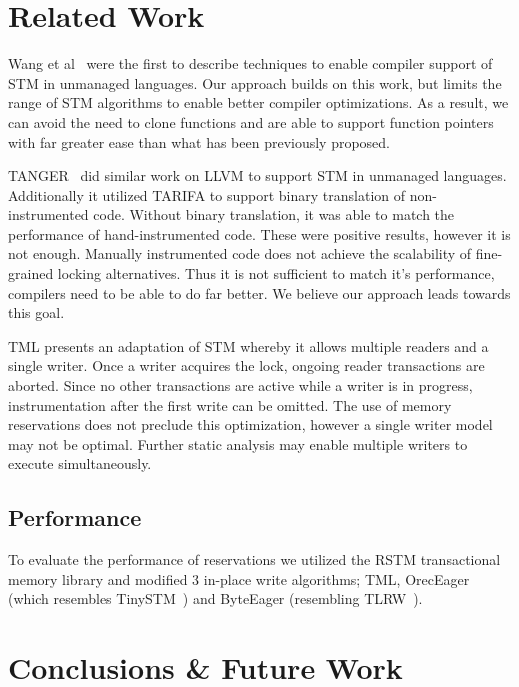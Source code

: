 \documentclass[preprint]{sigplanconf}
\begin{document}
\section{Related Work}

Wang et al~\cite{4145103} were the first to describe techniques to enable compiler support of STM in unmanaged languages. Our approach builds on this work, but limits the range of STM algorithms to enable better compiler optimizations. As a result, we can avoid the need to clone functions and are able to support function pointers with far greater ease than what has been previously proposed.

TANGER~\cite{felber2007tanger} did similar work on LLVM to support STM in unmanaged languages. Additionally it utilized TARIFA to support binary translation of non-instrumented code. Without binary translation, it was able to match the performance of hand-instrumented code. These were positive results, however it is not enough. Manually instrumented code does not achieve the scalability of fine-grained locking alternatives. Thus it is not sufficient to match it's performance, compilers need to be able to do far better. We believe our approach leads towards this goal.

TML\cite{Dalessandro:2010:TML:1885276.1885279} presents an adaptation of STM whereby it allows multiple readers and a single writer. Once a writer acquires the lock, ongoing reader transactions are aborted. Since no other transactions are active while a writer is in progress, instrumentation after the first write can be omitted. The use of memory reservations does not preclude this optimization, however a single writer model may not be optimal. Further static analysis may enable multiple writers to execute simultaneously.

\subsection{Performance}

To evaluate the performance of reservations we utilized the RSTM transactional memory library and modified 3 in-place write algorithms; TML, OrecEager (which resembles TinySTM~\cite{Felber:2008:DPT:1345206.1345241}) and ByteEager (resembling TLRW~\cite{Dice:2010:TRR:1810479.1810531}).

\section{Conclusions \& Future Work}
\end{document}
